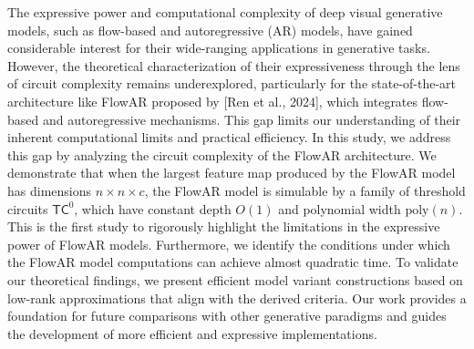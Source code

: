 The expressive power and computational complexity of deep visual generative models, such as flow-based and autoregressive (AR) models, have gained considerable interest for their wide-ranging applications in generative tasks. However, the theoretical characterization of their expressiveness through the lens of circuit complexity remains underexplored, particularly for the state-of-the-art architecture like FlowAR proposed by [Ren et al., 2024], which integrates flow-based and autoregressive mechanisms.  This gap limits our understanding of their inherent computational limits and practical efficiency. In this study, we address this gap by analyzing the circuit complexity of the FlowAR architecture. We demonstrate that when the largest feature map produced by the FlowAR model has dimensions $n \times n \times c$, the FlowAR model is simulable by a family of threshold circuits $\mathsf{TC}^0$, which have constant depth $O(1)$ and polynomial width $\mathrm{poly}(n)$. This is the first study to rigorously highlight the limitations in the expressive power of FlowAR models. Furthermore, we identify the conditions under which the FlowAR model computations can achieve almost quadratic time. To validate our theoretical findings, we present efficient model variant constructions based on low-rank approximations that align with the derived criteria. Our work provides a foundation for future comparisons with other generative paradigms and guides the development of more efficient and expressive implementations.
